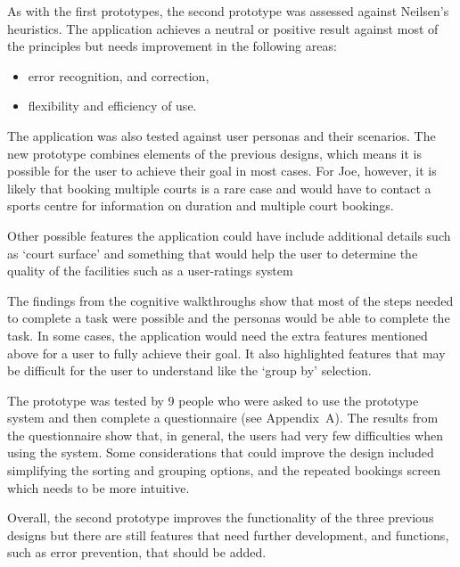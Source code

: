 As with the first prototypes, the second prototype was assessed against
Neilsen’s heuristics. The application achieves a neutral or positive result
against most of the principles but needs improvement in the following areas:
\begin{itemize}
	\item error recognition, and correction,
	\item flexibility and efficiency of use.
\end{itemize}

The application was also tested against user personas and their scenarios. The
new prototype combines elements of the previous designs, which means it is
possible for the user to achieve their goal in most cases. For Joe, however, it
is likely that booking multiple courts is a rare case and would have to contact
a sports centre for information on duration and multiple court bookings.

Other possible features the application could have include additional details
such as `court surface' and something that would help the user to determine the
quality of the facilities such as a user-ratings system

The findings from the cognitive walkthroughs show that most of the steps needed
to complete a task were possible and the personas would be able to complete the
task. In some cases, the application would need the extra features mentioned
above for a user to fully achieve their goal. It also highlighted features that
may be difficult for the user to understand like the `group by' selection.

The prototype was tested by 9 people who were asked to use the prototype
system and then complete a questionnaire (see Appendix~A). The results from the
questionnaire show that, in general, the users had very few difficulties when
using the system. Some considerations that could improve the design included
simplifying the sorting and grouping options, and the repeated bookings screen
which needs to be more intuitive.

Overall, the second prototype improves the functionality of the three previous
designs but there are still features that need further development, and
functions, such as error prevention, that should be added.
